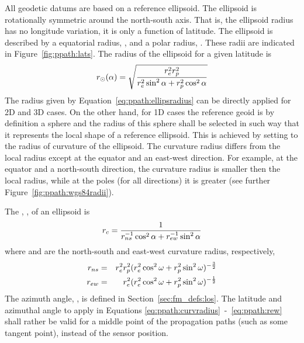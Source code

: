 \label{sec:ppath:geoid}

All geodetic datums are based on a reference ellipsoid. The ellipsoid is rotationally symmetric around the
north-south axis. That is, the ellipsoid radius has no longitude
variation, it is only a function of latitude. The ellipsoid is
described by a equatorial radius, , and a polar radius,
. These radii are indicated in Figure~\ref{fig:ppath:lats}.
The radius of the ellipsoid for a given latitude is
\begin{equation}
 r_{\odot}(\alpha) = \sqrt{\frac{r_{e}^2r_{p}^2}
                    {r_{e}^2\sin^2\alpha+r_{p}^2\cos^2\alpha}}
 \label{eq:ppath:ellipsradius} 
\end{equation}
The radius given by Equation~\ref{eq:ppath:ellipsradius} can be
directly applied for 2D and 3D cases. On the other hand, for 1D cases
the reference geoid is by definition a sphere and the radius of this
sphere shall be selected in such way that it represents the local
shape of a reference ellipsoid. This is achieved by setting
\aRds{\odot} to the radius of curvature of the ellipsoid. The
curvature radius differs from the local radius except at the equator
and an east-west direction. For example, at the equator and a
north-south direction, the curvature radius is smaller then the local
radius, while at the poles (for all directions) it is greater
(see further Figure~\ref{fig:ppath:wgs84radii}). 

The , , of an ellipsoid is 
\citep{rodgers:00}
\begin{equation}
 r_{c} = \frac{1}{r_{ns}^{-1}\cos^2 \alpha + r_{ew}^{-1}\sin^2 \alpha}
 \label{eq:ppath:curvradius} 
\end{equation}
where  and  are the north-south and east-west curvature radius, respectively,
\begin{eqnarray}
 r_{ns} &=& r_{e}^2r_{p}^2 (
           r_{e}^2\cos^2\omega+r_{p}^2\sin^2\omega )^{-\frac{3}{2}} \\
 r_{ew} &=& r_{e}^2 (
           r_{e}^2\cos^2\omega+r_{p}^2\sin^2\omega )^{-\frac{1}{2}} 
 \label{eq:ppath:rew} 
\end{eqnarray}
The azimuth angle, \AzmAng, is defined in
Section~\ref{sec:fm_defs:los}. The latitude and azimuthal angle to
apply in Equations \ref{eq:ppath:curvradius}~-~\ref{eq:ppath:rew}
shall rather be valid for a middle point of the propagation paths
(such as some tangent point), instead of the sensor position. 

